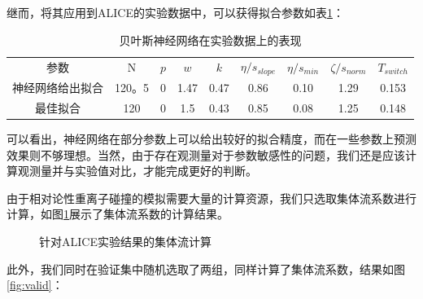 \documentclass[aps,pre,12pt,preprint,onecolumn,showpacs,showkeys]{revtex4-1}
\begin{document}
继而，将其应用到ALICE的实验数据中，可以获得拟合参数如表\ref{tab:ALICEdata}：\par
\begin{table}[htbp]
\caption{贝叶斯神经网络在实验数据上的表现\label{tab:ALICEdata}}
\begin{ruledtabular}
\begin{tabular}{ccccccccc}
参数&$\mathrm{N}$&$p$&$w$&$k$&$\eta/s_{slope}$&$\eta/s_{min}$&$\zeta/s_{norm}$&$T_{switch}$\\
\colrule
神经网络给出拟合&120。5&0&1.47&0.47&0.86&0.10&1.29&0.153\\
最佳拟合\cite{PhysRevC.94.024907}&120&0&1.5&0.43&0.85&0.08&1.25&0.148
\end{tabular}
\end{ruledtabular}
\end{table}
可以看出，神经网络在部分参数上可以给出较好的拟合精度，而在一些参数上预测效果则不够理想。当然，由于存在观测量对于参数敏感性的问题，我们还是应该计算观测量并与实验值对比，才能完成更好的判断。\par
由于相对论性重离子碰撞的模拟需要大量的计算资源，我们只选取集体流系数进行计算，如图\ref{fig:alice}展示了集体流系数的计算结果。\par
\begin{figure}[htbp]
\centering
{}
\caption{针对ALICE实验结果的集体流计算\label{fig:alice}}%
\end{figure}
此外，我们同时在验证集中随机选取了两组，同样计算了集体流系数，结果如图\ref{fig:valid}：\par
\end{document}
